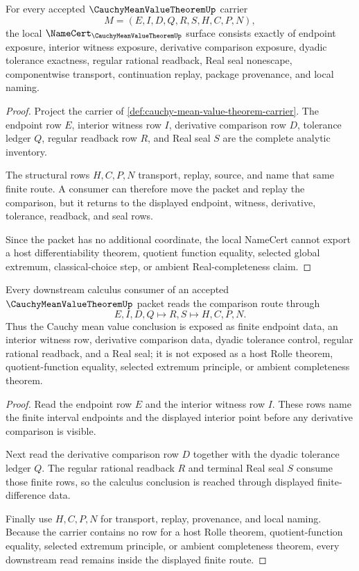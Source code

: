 \begin{theorem}\label{thm:cauchy-mean-value-theorem-namecert-obligations}
For every accepted $\CauchyMeanValueTheoremUp$ carrier
$$
M=(E,I,D,Q,R,S,H,C,P,N),
$$
the local $\NameCert_{\CauchyMeanValueTheoremUp}$ surface consists exactly of endpoint exposure, interior witness exposure, derivative comparison exposure, dyadic tolerance exactness, regular rational readback, Real seal nonescape, componentwise transport, continuation replay, package provenance, and local naming.
\end{theorem}
\begin{proof}
Project the carrier of \autoref{def:cauchy-mean-value-theorem-carrier}. The endpoint row $E$, interior witness row $I$, derivative comparison row $D$, tolerance ledger $Q$, regular readback row $R$, and Real seal $S$ are the complete analytic inventory.

The structural rows $H,C,P,N$ transport, replay, source, and name that same finite route. A consumer can therefore move the packet and replay the comparison, but it returns to the displayed endpoint, witness, derivative, tolerance, readback, and seal rows.

Since the packet has no additional coordinate, the local NameCert cannot export a host differentiability theorem, quotient function equality, selected global extremum, classical-choice step, or ambient Real-completeness claim.
\end{proof}

\begin{theorem}\label{thm:cauchy-mean-value-theorem-finite-difference-route}
Every downstream calculus consumer of an accepted $\CauchyMeanValueTheoremUp$ packet reads the comparison route through
$$
E,I,D,Q \longmapsto R,S \longmapsto H,C,P,N .
$$
Thus the Cauchy mean value conclusion is exposed as finite endpoint data, an interior witness row, derivative comparison data, dyadic tolerance control, regular rational readback, and a Real seal; it is not exposed as a host Rolle theorem, quotient-function equality, selected extremum principle, or ambient completeness theorem.
\end{theorem}
\begin{proof}
Read the endpoint row $E$ and the interior witness row $I$. These rows name the finite interval endpoints and the displayed interior point before any derivative comparison is visible.

Next read the derivative comparison row $D$ together with the dyadic tolerance ledger $Q$. The regular rational readback $R$ and terminal Real seal $S$ consume those finite rows, so the calculus conclusion is reached through displayed finite-difference data.

Finally use $H,C,P,N$ for transport, replay, provenance, and local naming. Because the carrier contains no row for a host Rolle theorem, quotient-function equality, selected extremum principle, or ambient completeness theorem, every downstream read remains inside the displayed finite route.
\end{proof}

